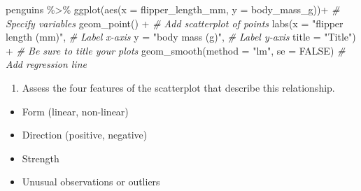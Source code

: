 \documentclass[
]{report}
\newenvironment{Shaded}{\begin{snugshade}}{\end{snugshade}}
\newcommand{\AttributeTok}[1]{\textcolor[rgb]{0.77,0.63,0.00}{#1}}
\newcommand{\CommentTok}[1]{\textcolor[rgb]{0.56,0.35,0.01}{\textit{#1}}}
\newcommand{\ConstantTok}[1]{\textcolor[rgb]{0.00,0.00,0.00}{#1}}
\newcommand{\FunctionTok}[1]{\textcolor[rgb]{0.00,0.00,0.00}{#1}}
\newcommand{\NormalTok}[1]{#1}
\newcommand{\SpecialCharTok}[1]{\textcolor[rgb]{0.00,0.00,0.00}{#1}}
\newcommand{\StringTok}[1]{\textcolor[rgb]{0.31,0.60,0.02}{#1}}
\providecommand{\tightlist}{%
  \setlength{\itemsep}{0pt}\setlength{\parskip}{0pt}}
\begin{document}
\begin{Shaded}
\begin{Highlighting}[]
\NormalTok{penguins }\SpecialCharTok{\%\textgreater{}\%}
  \FunctionTok{ggplot}\NormalTok{(}\FunctionTok{aes}\NormalTok{(}\AttributeTok{x =}\NormalTok{ flipper\_length\_mm, }\AttributeTok{y =}\NormalTok{ body\_mass\_g))}\SpecialCharTok{+}  \CommentTok{\# Specify variables}
  \FunctionTok{geom\_point}\NormalTok{() }\SpecialCharTok{+}  \CommentTok{\# Add scatterplot of points}
  \FunctionTok{labs}\NormalTok{(}\AttributeTok{x =} \StringTok{"flipper length (mm)"}\NormalTok{,  }\CommentTok{\# Label x{-}axis}
       \AttributeTok{y =} \StringTok{"body mass (g)"}\NormalTok{,  }\CommentTok{\# Label y{-}axis}
       \AttributeTok{title =} \StringTok{"Title"}\NormalTok{) }\SpecialCharTok{+} \CommentTok{\# Be sure to title your plots}
  \FunctionTok{geom\_smooth}\NormalTok{(}\AttributeTok{method =} \StringTok{"lm"}\NormalTok{, }\AttributeTok{se =} \ConstantTok{FALSE}\NormalTok{)  }\CommentTok{\# Add regression line}
\end{Highlighting}
\end{Shaded}

\begin{enumerate}
\def\labelenumi{\arabic{enumi}.}
\tightlist
\item
  Assess the four features of the scatterplot that describe this relationship.
  \vspace{1mm}
\end{enumerate}

\begin{itemize}
\tightlist
\item
  Form (linear, non-linear)
\end{itemize}

\vspace{.1in}

\begin{itemize}
\tightlist
\item
  Direction (positive, negative)
\end{itemize}

\vspace{.1in}

\begin{itemize}
\tightlist
\item
  Strength
\end{itemize}

\vspace{.1in}

\begin{itemize}
\tightlist
\item
  Unusual observations or outliers
\end{itemize}
\end{document}
